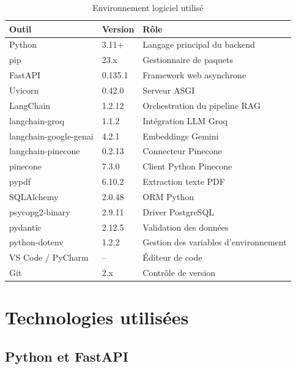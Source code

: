\documentclass[12pt, a4paper, twoside]{report}
\begin{document}
\begin{table}[H]
\centering
\caption{Environnement logiciel utilisé}
\label{tab:logiciel}
\begin{tabularx}{\textwidth}{l l X}
\toprule
\rowcolor{primary!10}
\textbf{Outil} & \textbf{Version} & \textbf{Rôle} \\
\midrule
Python              & 3.11+              & Langage principal du backend \\
pip                 & 23.x               & Gestionnaire de paquets \\
FastAPI             & 0.135.1            & Framework web asynchrone \\
Uvicorn             & 0.42.0             & Serveur ASGI \\
LangChain           & 1.2.12             & Orchestration du pipeline RAG \\
langchain-groq      & 1.1.2              & Intégration LLM Groq \\
langchain-google-genai & 4.2.1           & Embeddings Gemini \\
langchain-pinecone  & 0.2.13             & Connecteur Pinecone \\
pinecone            & 7.3.0              & Client Python Pinecone \\
pypdf               & 6.10.2             & Extraction texte PDF \\
SQLAlchemy          & 2.0.48             & ORM Python \\
psycopg2-binary     & 2.9.11             & Driver PostgreSQL \\
pydantic            & 2.12.5             & Validation des données \\
python-dotenv       & 1.2.2              & Gestion des variables d'environnement \\
VS Code / PyCharm   & --                 & Éditeur de code \\
Git                 & 2.x                & Contrôle de version \\
\bottomrule
\end{tabularx}
\end{table}

\section{Technologies utilisées}

\subsection{Python et FastAPI}
\end{document}
